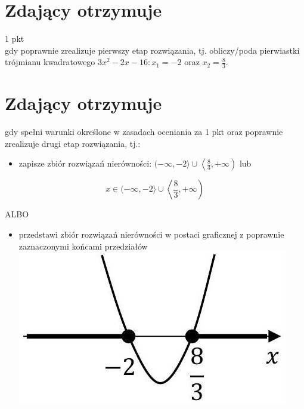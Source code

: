 \documentclass[10pt]{article}
\begin{document}
\section*{Zdający otrzymuje}
1 pkt\\
gdy poprawnie zrealizuje pierwszy etap rozwiązania, tj. obliczy/poda pierwiastki trójmianu kwadratowego $3 x^{2}-2 x-16: x_{1}=-2$ oraz $x_{2}=\frac{8}{3}$.

\section*{Zdający otrzymuje}
gdy spełni warunki określone w zasadach oceniania za 1 pkt oraz poprawnie zrealizuje drugi etap rozwiązania, tj.:

\begin{itemize}
  \item zapisze zbiór rozwiązań nierówności: $(-\infty,-2\rangle \cup\left\langle\frac{8}{3},+\infty\right)$ lub
\end{itemize}

$$
x \in(-\infty,-2\rangle \cup\left\langle\frac{8}{3},+\infty\right)
$$

ALBO

\begin{itemize}
  \item przedstawi zbiór rozwiązań nierówności w postaci graficznej z poprawnie zaznaczonymi końcami przedziałów\\
\includegraphics[max width=\textwidth, center]{2025_02_07_191ba7668814b12476d0g-13}
\end{itemize}
\end{document}
